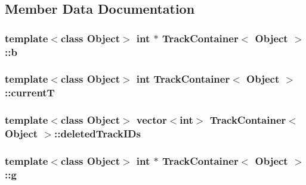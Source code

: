 \subsection{\-Member \-Data \-Documentation}
\hypertarget{class_track_container_a090d3d6e83acad80cad082cd718a4ab3}{
\subsubsection[{b}]{\setlength{\rightskip}{0pt plus 5cm}template$<$class \-Object$>$ int $\ast$ {\bf \-Track\-Container}$<$ \-Object $>$\-::{\bf b}}}\label{class_track_container_a090d3d6e83acad80cad082cd718a4ab3}
\hypertarget{class_track_container_a5bb638a32d63aab28ca962a86b481262}{
\subsubsection[{current\-T}]{\setlength{\rightskip}{0pt plus 5cm}template$<$class \-Object$>$ int {\bf \-Track\-Container}$<$ \-Object $>$\-::{\bf current\-T}}}\label{class_track_container_a5bb638a32d63aab28ca962a86b481262}
\hypertarget{class_track_container_a17fafd224f076ad6d2a97433b6afa91d}{
\subsubsection[{deleted\-Track\-I\-Ds}]{\setlength{\rightskip}{0pt plus 5cm}template$<$class \-Object$>$ vector$<$int$>$ {\bf \-Track\-Container}$<$ \-Object $>$\-::{\bf deleted\-Track\-I\-Ds}}}\label{class_track_container_a17fafd224f076ad6d2a97433b6afa91d}
\hypertarget{class_track_container_ab08bd9bc429d2bf3bf8a0a81ddb27752}{
\subsubsection[{g}]{\setlength{\rightskip}{0pt plus 5cm}template$<$class \-Object$>$ int $\ast$ {\bf \-Track\-Container}$<$ \-Object $>$\-::{\bf g}}}\label{class_track_container_ab08bd9bc429d2bf3bf8a0a81ddb27752}
